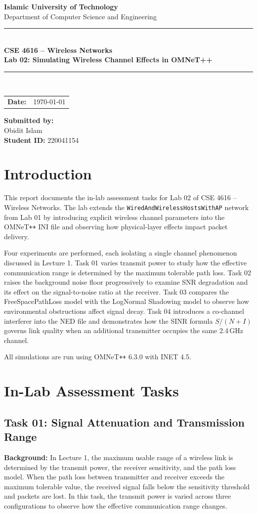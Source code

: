\documentclass[12pt]{article}
\newcommand{\maketitlepage}{
    \begin{titlepage}
        \centering
        \vspace*{1.5cm}

        {\Huge \textbf{Islamic University of Technology}}\\[12pt]
        {\Large Department of Computer Science and Engineering}\\[25pt]

        \rule{0.85\textwidth}{0.6pt} \\[14pt]

        {\LARGE \textbf{CSE 4616 -- Wireless Networks}}\\[8pt]
        {\Large \textbf{Lab 02: Simulating Wireless Channel Effects in OMNeT++}}\\[6pt]

        \rule{0.85\textwidth}{0.6pt} \\[40pt]

        \begin{tabular}{rl}
            \textbf{Date:} & \today
        \end{tabular}

        \vspace{4cm}

        \hfill
        \begin{minipage}{0.50\textwidth}
            \raggedleft
            \textbf{Submitted by:} \\
            Obidit Islam \\
            \textbf{Student ID:} 220041154
        \end{minipage}

        \vfill
    \end{titlepage}
}
\begin{document}
\maketitlepage

\section{Introduction}

This report documents the in-lab assessment tasks for Lab 02 of CSE 4616 -- Wireless
Networks. The lab extends the \texttt{WiredAndWirelessHostsWithAP} network
from Lab 01 by introducing explicit wireless channel parameters into the
OMNeT\texttt{++} INI file and observing how physical-layer effects impact packet
delivery.

Four experiments are performed, each isolating a single channel phenomenon discussed
in Lecture 1. Task 01 varies transmit power to study how the effective communication
range is determined by the maximum tolerable path loss. Task 02 raises the background
noise floor progressively to examine SNR degradation and its effect on the
signal-to-noise ratio at the receiver. Task 03 compares the FreeSpacePathLoss model
with the LogNormal Shadowing model to observe how environmental obstructions affect
signal decay. Task 04 introduces a co-channel interferer into the NED file and
demonstrates how the SINR formula $S/(N+I)$ governs link quality when an additional
transmitter occupies the same 2.4\,GHz channel.

All simulations are run using OMNeT\texttt{++} 6.3.0 with INET 4.5.

\section{In-Lab Assessment Tasks}

\subsection{Task 01: Signal Attenuation and Transmission Range}

\textbf{Background:} In Lecture 1, the maximum usable range of a wireless link is
determined by the transmit power, the receiver sensitivity, and the path loss model.
When the path loss between transmitter and receiver exceeds the maximum tolerable
value, the received signal falls below the sensitivity threshold and packets are lost.
In this task, the transmit power is varied across three configurations to observe how
the effective communication range changes.
\end{document}
